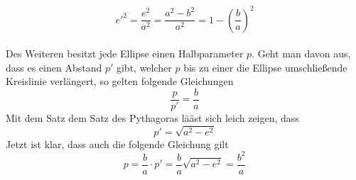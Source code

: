 \begin{equation}
	e'^2=\frac{e^2}{a^2}=\frac{a^2-b^2}{a^2}=1-\left(\frac{b}{a}\right)^2 
	\label{equation_kepler_b}
\end{equation} 
\\Des Weiteren besitzt jede Ellipse einen Halbparameter \ensuremath{p}. Geht man davon aus, dass es einen Abstand \ensuremath{p'} gibt, welcher \ensuremath{p} bis zu einer die Ellipse umschließende Kreislinie verlängert, so gelten folgende Gleichungen
\begin{equation}
	\frac{p}{p'}=\frac{b}{a}
	\label{equation_kepler_p}
\end{equation}
Mit dem Satz dem Satz des Pythagoras lääst sich leich zeigen, dass
\begin{equation}
p' = \sqrt{a^2-e^2}
\end{equation}
Jetzt ist klar, dass auch die folgende Gleichung gilt
\begin{equation}
p=\frac{b}{a} \cdot p'= \frac{b}{a} \sqrt{a^2-e^2} = \frac{b^2}{a}
\label{equation_kepler_simple_p}
\end{equation}

